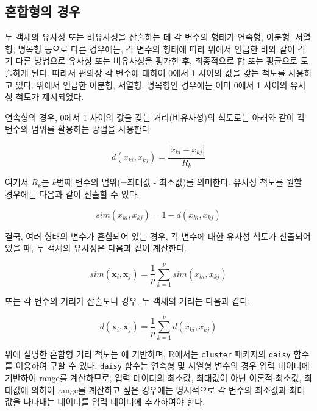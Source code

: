 \documentclass[]{book}
\begin{document}
\hypertarget{mixed-similarity-metric}{%
\subsection{혼합형의 경우}\label{mixed-similarity-metric}}

두 객체의 유사성 또는 비유사성을 산출하는 데 각 변수의 형태가 연속형, 이분형, 서열형, 명목형 등으로 다른 경우에는, 각 변수의 형태에 따라 위에서 언급한 바와 같이 각기 다른 방법으로 유사성 또는 비유사성을 평가한 후, 최종적으로 합 또는 평균으로 도출하게 된다. 따라서 편의상 각 변수에 대하여 0에서 1 사이의 값을 갖는 척도를 사용하고 있다. 위에서 언급한 이분형, 서열형, 명목형인 경우에는 이미 0에서 1 사이의 유사성 척도가 제시되었다.

연속형의 경우, 0에서 1 사이의 값을 갖는 거리(비유사성)의 척도로는 아래와 같이 각 변수의 범위를 활용하는 방법을 사용한다.

\begin{equation*}
d(x_{ki}, x_{kj}) = \frac{|x_{ki} - x_{kj}|}{R_k}
\end{equation*}

여기서 \(R_k\)는 \(k\)번째 변수의 범위(=최대값 - 최소값)를 의미한다. 유사성 척도를 원할 경우에는 다음과 같이 산출할 수 있다.

\begin{equation*}
sim(x_{ki}, x_{kj}) = 1 - d(x_{ki}, x_{kj})
\end{equation*}

결국, 여러 형태의 변수가 혼합되어 있는 경우, 각 변수에 대한 유사성 척도가 산출되어 있을 때, 두 객체의 유사성은 다음과 같이 계산한다.

\begin{equation*}
sim(\mathbf{x}_i, \mathbf{x}_j) = \frac{1}{p} \sum_{k = 1}^{p} sim(x_{ki}, x_{kj})
\end{equation*}

또는 각 변수의 거리가 산출도니 경우, 두 객체의 거리는 다음과 같다.

\begin{equation*}
d(\mathbf{x}_i, \mathbf{x}_j) = \frac{1}{p} \sum_{k = 1}^{p} d(x_{ki}, x_{kj})
\end{equation*}

위에 설명한 혼합형 거리 척도는 \citet{gower1971general} 에 기반하며, R에서는 \texttt{cluster} 패키지의 \texttt{daisy} 함수를 이용하여 구할 수 있다. \texttt{daisy} 함수는 연속형 및 서열형 변수의 경우 입력 데이터에 기반하여 range를 계산하므로, 입력 데이터의 최소값, 최대값이 아닌 이론적 최소값, 최대값에 의하여 range를 계산하고 싶은 경우에는 명시적으로 각 변수의 최소값과 최대값을 나타내는 데이터를 입력 데이터에 추가하여야 한다.
\end{document}
